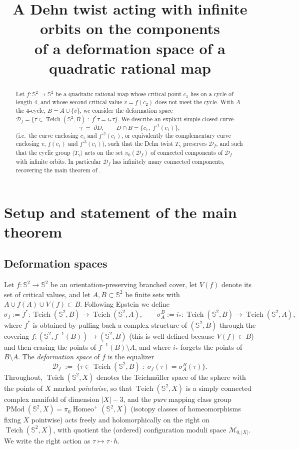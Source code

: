 \documentclass[11pt]{amsart}
\newcommand{\Sph}{\mathbb{S}^{2}}
\newcommand{\Teich}{\operatorname{Teich}}
\newcommand{\PMod}{\operatorname{PMod}}
\newcommand{\Def}{\mathcal{D}}
\newcommand{\Homeo}{\operatorname{Homeo}}
\begin{document}
\title{A Dehn twist acting with infinite orbits on the components\\
of a deformation space of a quadratic rational map}

\author{}
\date{}

\begin{abstract}
Let $f:\Sph\to\Sph$ be a quadratic rational map whose critical point $c_1$
lies on a cycle of length $4$, and whose second critical value $v=f(c_2)$
does not meet the cycle. With $A$ the $4$-cycle, $B=A\cup\{v\}$, we consider
the deformation space $\Def_f=\{\tau\in\Teich(\Sph,B)\;:\; f^*\tau=i_*\tau\}$.
We describe an explicit simple closed curve
\[
\gamma \;=\; \partial D,\qquad D\cap B=\{c_1,\;f^{\circ 2}(c_1)\},
\]
(i.e.\ the curve enclosing $c_1$ and $f^{\circ 2}(c_1)$, or equivalently the
complementary curve enclosing $v$, $f(c_1)$ and $f^{\circ 3}(c_1)$), such
that the Dehn twist $T_\gamma$ preserves $\Def_f$, and such that the cyclic
group $\langle T_\gamma\rangle$ acts on the set $\pi_0(\Def_f)$ of connected
components of $\Def_f$ with infinite orbits. In particular $\Def_f$ has
infinitely many connected components, recovering the main theorem of
\cite{Luo}.
\end{abstract}

\maketitle

\section{Setup and statement of the main theorem}

\subsection{Deformation spaces}
Let $f:\Sph\to\Sph$ be an orientation-preserving branched cover, let
$V(f)$ denote its set of critical values, and let $A,B\subset\Sph$ be finite
sets with $A\cup f(A)\cup V(f)\subset B$. Following Epstein
\cite{Epstein} we define
\[
\sigma_f:=f^*:\Teich(\Sph,B)\longrightarrow \Teich(\Sph,A),
\qquad
\sigma^B_A:=i_*:\Teich(\Sph,B)\longrightarrow \Teich(\Sph,A),
\]
where $f^*$ is obtained by pulling back a complex structure of
$(\Sph,B)$ through the covering $f:(\Sph,f^{-1}(B))\to(\Sph,B)$ (this is
well defined because $V(f)\subset B$) and then erasing the points of
$f^{-1}(B)\setminus A$, and where $i_*$ forgets the points of $B\setminus A$.
The \emph{deformation space} of $f$ is the equalizer
\[
\Def_f \;:=\;\{\tau\in\Teich(\Sph,B)\;:\;\sigma_f(\tau)=\sigma^B_A(\tau)\}.
\]
Throughout, $\Teich(\Sph,X)$ denotes the Teichm\"uller space of the sphere
with the points of $X$ marked \emph{pointwise}, so that
$\Teich(\Sph,X)$ is a simply connected complex manifold of dimension
$|X|-3$, and the \emph{pure} mapping class group
$\PMod(\Sph,X)=\pi_0\Homeo^+(\Sph,X)$ (isotopy classes of homeomorphisms
fixing $X$ pointwise) acts freely and holomorphically on the right on
$\Teich(\Sph,X)$, with quotient the (ordered) configuration moduli space
$\mathcal{M}_{0,|X|}$. We write the right action as $\tau\mapsto\tau\cdot h$.
\end{document}
